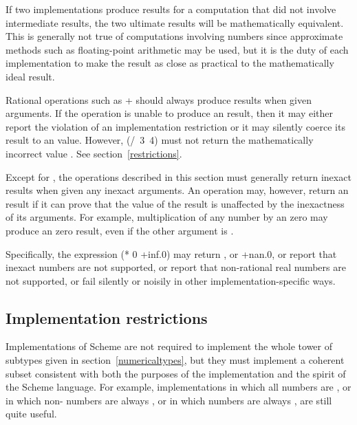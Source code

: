 \vest If two implementations produce  results for a
computation that did not involve  intermediate results,
the two ultimate results will be mathematically equivalent.  This is
generally not true of computations involving  numbers
since approximate methods such as floating-point arithmetic may be used,
but it is the duty of each implementation to make the result as close as
practical to the mathematically ideal result.

\vest Rational operations such as {\cf +} should always produce
 results when given  arguments.
If the operation is unable to produce an  result,
then it may either report the violation of an implementation restriction
or it may silently coerce its
result to an  value.
However, {\cf (/~3~4)} must not return the mathematically incorrect value {}.
See section~\ref{restrictions}.

\vest Except for , the operations described in
this section must generally return inexact results when given any inexact
arguments.  An operation may, however, return an  result if it can
prove that the value of the result is unaffected by the inexactness of its
arguments.  For example, multiplication of any number by an  zero
may produce an  zero result, even if the other argument is
.

Specifically, the expression {\cf (* 0 +inf.0)} may return {},
or {\cf +nan.0}, or report that inexact numbers are not supported,
or report that non-rational real numbers are not supported, or fail
silently or noisily in other implementation-specific ways.

\subsection{Implementation restrictions}

\label{restrictions}

\vest Implementations of Scheme are not required to implement the whole
tower of subtypes given in section~\ref{numericaltypes},
but they must implement a coherent subset consistent with both the
purposes of the implementation and the spirit of the Scheme language.
For example, implementations in which all numbers are ,
or in which non- numbers are always ,
or in which  numbers are always ,
are still quite useful.


